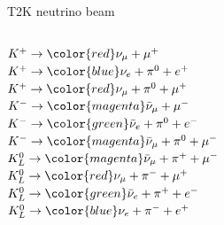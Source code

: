 \begin{frame}{T2K neutrino beam}
\begin{columns}
\begin{column}{0.22\textwidth}
\begin{block}{}
{    $K^{+} \rightarrow {\color{red}\nu_{\mu}} + \mu^{+}$\\
    $K^{+} \rightarrow {\color{blue}\nu_{e}} + \pi^{0} + e^{+}$\\
    $K^{+} \rightarrow {\color{red}\nu_{\mu}} + \pi^{0} + \mu^{+}$\\
    $K^{-} \rightarrow {\color{magenta}\bar{\nu}_{\mu}} + \mu^{-}$\\
    $K^{-} \rightarrow {\color{green}\bar{\nu}_{e}} + \pi^{0} + e^{-}$\\
    $K^{-} \rightarrow {\color{magenta}\bar{\nu}_{\mu}} + \pi^{0} + \mu^{-}$\\
    $K_{L}^{0} \rightarrow {\color{magenta}\bar{\nu}_{\mu}} + \pi^{+} + \mu^{-}$\\
    $K_{L}^{0} \rightarrow {\color{red}\nu_{\mu}} + \pi^{-} + \mu^{+}$\\
    $K_{L}^{0} \rightarrow {\color{green}\bar{\nu}_{e}} + \pi^{+} + e^{-}$\\
    $K_{L}^{0} \rightarrow {\color{blue}\nu_{e}} + \pi^{-} + e^{+}$\\
  }
  \end{block}
  \end{column}
\end{columns}
\end{frame}


